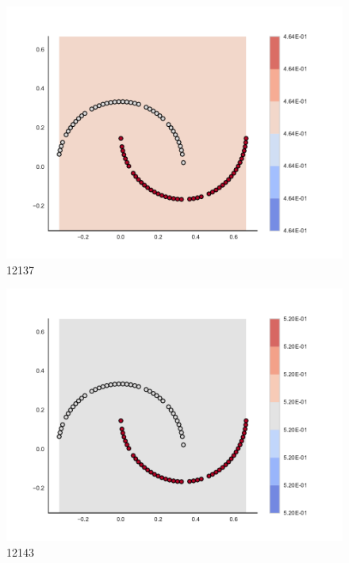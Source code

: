 \begin{subfigure}[b]{0.09\textwidth}
    \includegraphics[clip, trim=2.35cm 1.75cm 4.5cm 0cm,width=\textwidth]{img/convergence/12137.pdf}
    \caption{12137}
    \label{fig:convergence_12137}
\end{subfigure}
%
\begin{subfigure}[b]{0.09\textwidth}
    \includegraphics[clip, trim=2.35cm 1.75cm 4.5cm 0cm,width=\textwidth]{img/convergence/12143.pdf}
    \caption{12143}
    \label{fig:convergence_12143}
\end{subfigure}
%
